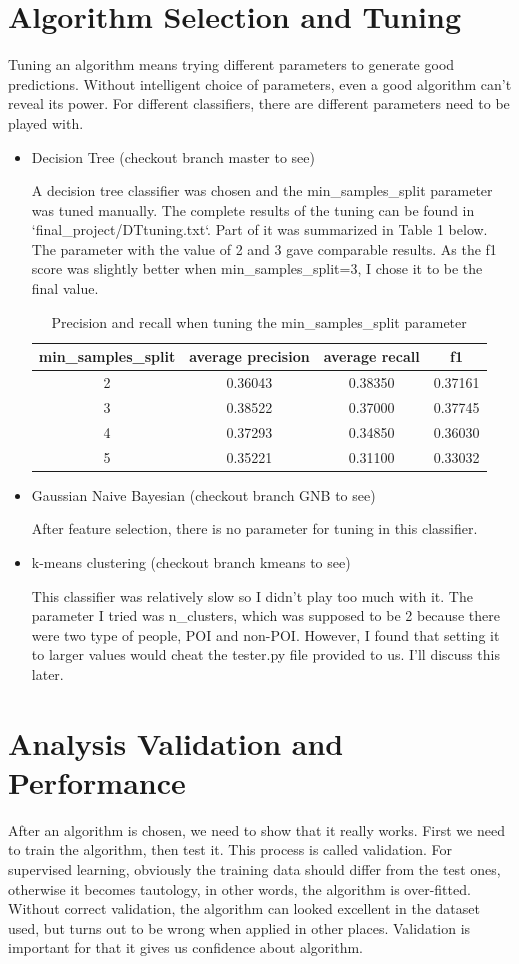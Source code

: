\documentclass[12pt]{article}
\begin{document}
\section{Algorithm Selection and Tuning}
Tuning an algorithm means trying different parameters to generate good predictions. Without intelligent choice of parameters, even a good algorithm can't reveal its power. For different classifiers, there are different parameters need to be played with.
\begin{itemize}
\item Decision Tree (checkout branch master to see)

A decision tree classifier was chosen and the min\_samples\_split parameter was tuned manually. The complete results of the tuning can be found in ‘final\_project/DTtuning.txt‘. Part of it was summarized in Table 1 below. The parameter with the value of 2 and 3 gave comparable results. As the f1 score was slightly better when min\_samples\_split=3, I chose it to be the final value.

\begin{table}[h]
\caption{Precision and recall when tuning the min\_samples\_split parameter}
\centering
\begin{tabular}{cccc}
\toprule
min\_samples\_split & average precision & average recall & f1 \\
\midrule
2 & 0.36043 & 0.38350 & 0.37161 \\
3 & 0.38522 & 0.37000 & 0.37745 \\
4 & 0.37293 & 0.34850 & 0.36030 \\
5 & 0.35221 & 0.31100 & 0.33032 \\
\bottomrule
\end{tabular}
\end{table}


\item Gaussian Naive Bayesian (checkout branch GNB to see)

After feature selection, there is no parameter for tuning in this classifier.
\item k-means clustering (checkout branch kmeans to see)

This classifier was relatively slow so I didn't play too much with it. The parameter I tried was n\_clusters, which was supposed to be 2 because there were two type of people, POI and non-POI. However, I found that setting it to larger values would cheat the tester.py file provided to us. I'll discuss this later.
\end{itemize}
\section{Analysis Validation and Performance}
After an algorithm is chosen, we need to show that it really works. First we need to train the algorithm, then test it. This process is called validation. For supervised learning, obviously the training data should differ from the test ones, otherwise it becomes tautology, in other words, the algorithm is over-fitted. Without correct validation, the algorithm can looked excellent in the dataset used, but turns out to be wrong when applied in other places. Validation is important for that it gives us confidence about algorithm.
\end{document}
